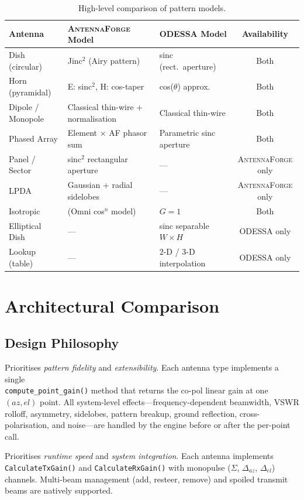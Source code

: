 \documentclass[11pt,a4paper]{article}
\newcommand{\AF}{\textsc{AntennaForge}}
\newcommand{\OD}{\textsc{ODESSA}}
\begin{document}
\begin{table}[H]
\centering
\caption{High-level comparison of pattern models.}
\label{tab:summary}
\small
\begin{tabularx}{\textwidth}{l X X c}
\toprule
\textbf{Antenna} & \textbf{\AF{} Model} & \textbf{\OD{} Model} & \textbf{Availability} \\
\midrule
Dish (circular) & Jinc$^2$ (Airy pattern) & sinc (rect.\ aperture) & Both \\
Horn (pyramidal) & E: sinc$^2$, H: cos-taper & cos($\theta$) approx. & Both \\
Dipole / Monopole & Classical thin-wire + normalisation & Classical thin-wire & Both \\
Phased Array & Element $\times$ AF phasor sum & Parametric sinc aperture & Both \\
Panel / Sector & sinc$^2$ rectangular aperture & --- & \AF{} only \\
LPDA & Gaussian + radial sidelobes & --- & \AF{} only \\
Isotropic & (Omni cos$^n$ model) & $G = 1$ & Both \\
Elliptical Dish & --- & sinc separable $W \times H$ & \OD{} only \\
Lookup (table) & --- & 2-D / 3-D interpolation & \OD{} only \\
\bottomrule
\end{tabularx}
\end{table}

\section{Architectural Comparison}

\subsection{Design Philosophy}

\begin{description}[leftmargin=1.5em, style=nextline]
  \item[\AF{}] Prioritises \emph{pattern fidelity} and \emph{extensibility}. Each
    antenna type implements a single \\ \texttt{compute\_point\_gain()} method that
    returns the co-pol linear gain at one $(az, el)$ point. All system-level
    effects---frequency-dependent beamwidth, VSWR rolloff, asymmetry, sidelobes,
    pattern breakup, ground reflection, cross-polarisation, and noise---are
    handled by the engine before or after the per-point call.

  \item[\OD{}] Prioritises \emph{runtime speed} and \emph{system integration}.
    Each antenna implements \texttt{CalculateTxGain()} and
    \texttt{CalculateRxGain()} with monopulse ($\Sigma$, $\Delta_{az}$,
    $\Delta_{el}$) channels. Multi-beam management (add, resteer, remove) and
    spoiled transmit beams are natively supported.
\end{description}
\end{document}
